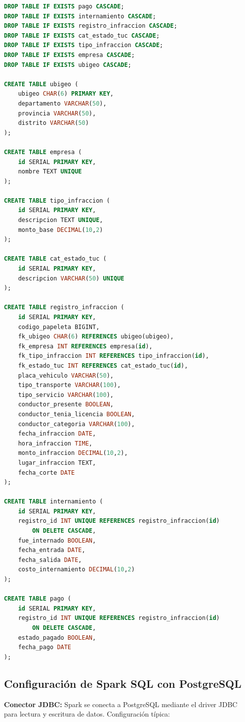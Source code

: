 \documentclass[12pt,a4paper]{article}
\begin{document}
\begin{lstlisting}[language=SQL, caption={Creación de tablas en PostgreSQL}]
DROP TABLE IF EXISTS pago CASCADE;
DROP TABLE IF EXISTS internamiento CASCADE;
DROP TABLE IF EXISTS registro_infraccion CASCADE;
DROP TABLE IF EXISTS cat_estado_tuc CASCADE;
DROP TABLE IF EXISTS tipo_infraccion CASCADE;
DROP TABLE IF EXISTS empresa CASCADE;
DROP TABLE IF EXISTS ubigeo CASCADE;

CREATE TABLE ubigeo (
    ubigeo CHAR(6) PRIMARY KEY,
    departamento VARCHAR(50),
    provincia VARCHAR(50),
    distrito VARCHAR(50)
);

CREATE TABLE empresa (
    id SERIAL PRIMARY KEY,
    nombre TEXT UNIQUE
);

CREATE TABLE tipo_infraccion (
    id SERIAL PRIMARY KEY,
    descripcion TEXT UNIQUE,
    monto_base DECIMAL(10,2)
);

CREATE TABLE cat_estado_tuc (
    id SERIAL PRIMARY KEY,
    descripcion VARCHAR(50) UNIQUE
);

CREATE TABLE registro_infraccion (
    id SERIAL PRIMARY KEY,
    codigo_papeleta BIGINT,
    fk_ubigeo CHAR(6) REFERENCES ubigeo(ubigeo),
    fk_empresa INT REFERENCES empresa(id),
    fk_tipo_infraccion INT REFERENCES tipo_infraccion(id),
    fk_estado_tuc INT REFERENCES cat_estado_tuc(id),
    placa_vehiculo VARCHAR(50),
    tipo_transporte VARCHAR(100),
    tipo_servicio VARCHAR(100),
    conductor_presente BOOLEAN,
    conductor_tenia_licencia BOOLEAN,
    conductor_categoria VARCHAR(100),
    fecha_infraccion DATE,
    hora_infraccion TIME,
    monto_infraccion DECIMAL(10,2),
    lugar_infraccion TEXT,
    fecha_corte DATE
);

CREATE TABLE internamiento (
    id SERIAL PRIMARY KEY,
    registro_id INT UNIQUE REFERENCES registro_infraccion(id) 
        ON DELETE CASCADE,
    fue_internado BOOLEAN,
    fecha_entrada DATE,
    fecha_salida DATE,
    costo_internamiento DECIMAL(10,2)
);

CREATE TABLE pago (
    id SERIAL PRIMARY KEY,
    registro_id INT UNIQUE REFERENCES registro_infraccion(id) 
        ON DELETE CASCADE,
    estado_pagado BOOLEAN,
    fecha_pago DATE
);
\end{lstlisting}

\subsection{Configuración de Spark SQL con PostgreSQL}

\textbf{Conector JDBC:} Spark se conecta a PostgreSQL mediante el driver JDBC para lectura y escritura de datos. Configuración típica:
\end{document}
